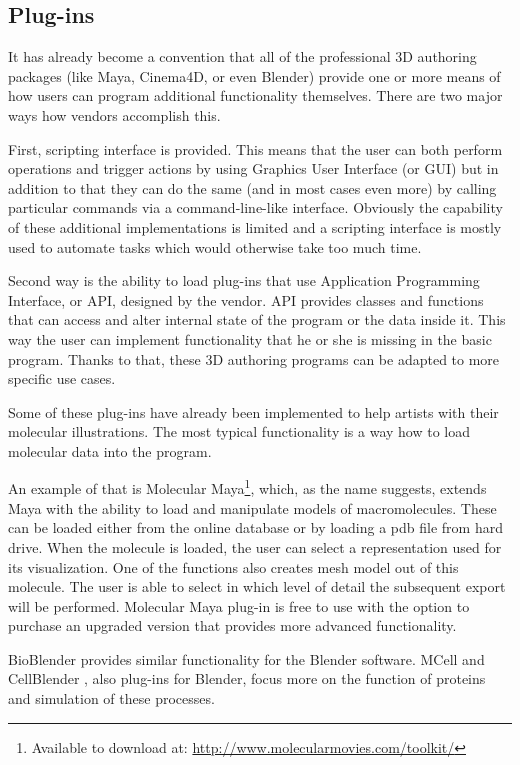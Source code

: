 \documentclass[
  digital, %
  table,   %
  nolof,     %
  nolot,     %
  oneside,
]{fithesis3}
\begin{document}
\subsection{Plug-ins}
It has already become a convention that all of the professional 3D authoring packages (like Maya, Cinema4D, or even Blender) provide one or more means of how users can program additional functionality themselves. There are two major ways how vendors accomplish this.

First, scripting interface is provided. This means that the user can both perform operations and trigger actions by using Graphics User Interface (or GUI) but in addition to that they can do the same (and in most cases even more) by calling particular commands via a command-line-like interface. Obviously the capability of these additional implementations is limited and a scripting interface is mostly used to automate tasks which would otherwise take too much time.

Second way is the ability to load plug-ins that use Application Programming Interface, or API, designed by the vendor. API provides classes and functions that can access and alter internal state of the program or the data inside it. This way the user can implement functionality that he or she is missing in the basic program. Thanks to that, these 3D authoring programs can be adapted to more specific use cases.

Some of these plug-ins have already been implemented to help artists with their molecular illustrations. The most typical functionality is a way how to load molecular data into the program.

An example of that is Molecular Maya\footnote{Available to download at: \url{http://www.molecularmovies.com/toolkit/}}, which, as the name suggests, extends Maya with the ability to load and manipulate models of macromolecules. These can be loaded either from the online database or by loading a pdb file from hard drive. When the molecule is loaded, the user can select a representation used for its visualization. One of the functions also creates mesh model out of this molecule. The user is able to select in which level of detail the subsequent export will be performed. Molecular Maya plug-in is free to use with the option to purchase an upgraded version that provides more advanced functionality.

BioBlender provides similar functionality for the Blender software. MCell and CellBlender \cite{mcell}, also plug-ins for Blender, focus more on the function of proteins and simulation of these processes.
\end{document}
